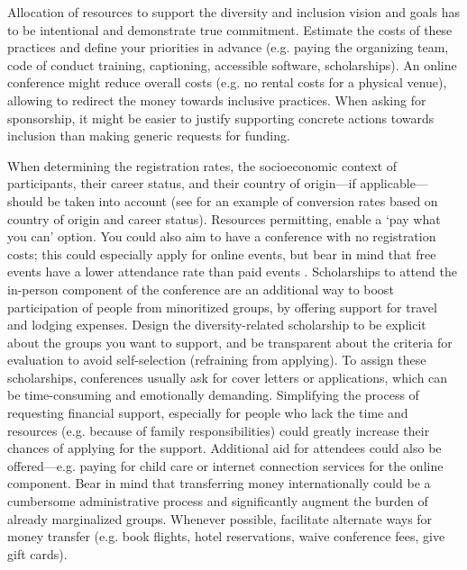 \documentclass[10pt,letterpaper]{article}
\begin{document}
Allocation of resources to support the diversity and inclusion vision and goals has to be intentional and demonstrate true commitment. 
Estimate the costs of these practices and define your priorities in advance (e.g. paying the organizing team, code of conduct training, captioning, accessible software, scholarships).
An online conference might reduce overall costs (e.g. no rental costs for a physical venue), allowing to redirect the money towards inclusive practices. 
When asking for sponsorship, it might be easier to justify supporting concrete actions towards inclusion than making generic requests for funding.

When determining the registration rates, the socioeconomic context of participants, their career status, and their country of origin—if applicable—should be taken into account  \cite{sarabipourChangingScientificMeetings2021, andalibPostdocQueueLabour2018, kaplanPostdocNot2012}
(see \cite{canelon2021cost} for an example of conversion rates based on country of origin and career status).
Resources permitting, enable a `pay what you can' option. You could also aim to have a conference with no registration costs; this could especially apply for online events, but bear in mind that free events have a lower attendance rate than paid events \cite{eventbrite_ultimate_2017}. 
Scholarships to attend the in-person component of the conference are an additional way to boost participation of people from minoritized groups, by offering support for travel and lodging expenses.
Design the diversity-related scholarship to be explicit about the groups you want to support, and be transparent about the criteria for evaluation to avoid self-selection (refraining from applying). 
To assign these scholarships, conferences usually ask for cover letters or applications, which can be time-consuming and emotionally demanding. 
Simplifying the process of requesting financial support, especially for 
people who lack the time and resources (e.g. because of family responsibilities) could greatly increase their chances of applying for the support. 
Additional aid for attendees could also be offered—e.g. paying for child care or internet connection services for the online component. 
Bear in mind that transferring money internationally could be a cumbersome administrative process and significantly augment the burden of already marginalized groups. Whenever possible, facilitate alternate ways for money transfer (e.g. book flights, hotel reservations, waive conference fees, give gift cards). 
\end{document}
